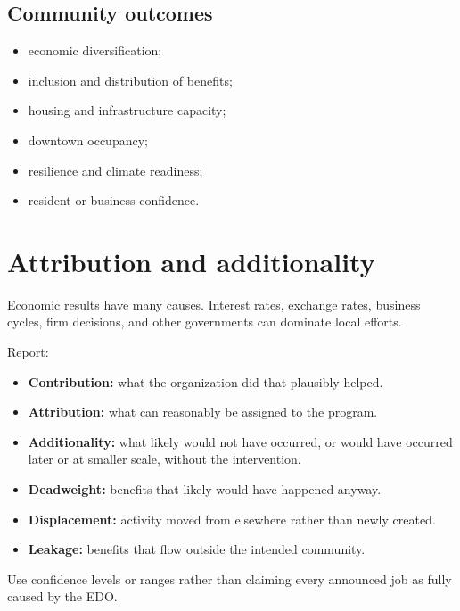 \documentclass[11pt,letterpaper,oneside,openany]{book}
\begin{document}
\subsection[Community outcomes]{Community outcomes}
\begin{itemize}
\item economic diversification;
\item inclusion and distribution of benefits;
\item housing and infrastructure capacity;
\item downtown occupancy;
\item resilience and climate readiness;
\item resident or business confidence.
\end{itemize}


\section[Attribution and additionality]{Attribution and additionality}
Economic results have many causes. Interest rates, exchange rates, business cycles, firm decisions, and other governments can dominate local efforts.


Report:


\begin{itemize}
\item \textbf{Contribution:} what the organization did that plausibly helped.
\item \textbf{Attribution:} what can reasonably be assigned to the program.
\item \textbf{Additionality:} what likely would not have occurred, or would have occurred later or at smaller scale, without the intervention.
\item \textbf{Deadweight:} benefits that likely would have happened anyway.
\item \textbf{Displacement:} activity moved from elsewhere rather than newly created.
\item \textbf{Leakage:} benefits that flow outside the intended community.
\end{itemize}


Use confidence levels or ranges rather than claiming every announced job as fully caused by the EDO.


\end{document}
